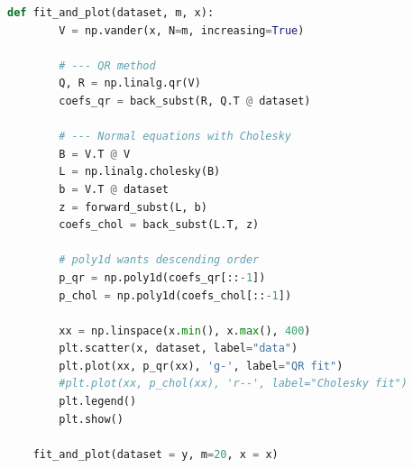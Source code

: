 \documentclass[11pt]{article}
\begin{document}
\begin{lstlisting}[language=Python]
    def fit_and_plot(dataset, m, x):
        V = np.vander(x, N=m, increasing=True)

        # --- QR method
        Q, R = np.linalg.qr(V)
        coefs_qr = back_subst(R, Q.T @ dataset)

        # --- Normal equations with Cholesky
        B = V.T @ V
        L = np.linalg.cholesky(B)
        b = V.T @ dataset
        z = forward_subst(L, b)
        coefs_chol = back_subst(L.T, z)

        # poly1d wants descending order
        p_qr = np.poly1d(coefs_qr[::-1])
        p_chol = np.poly1d(coefs_chol[::-1])

        xx = np.linspace(x.min(), x.max(), 400)
        plt.scatter(x, dataset, label="data")
        plt.plot(xx, p_qr(xx), 'g-', label="QR fit")
        #plt.plot(xx, p_chol(xx), 'r--', label="Cholesky fit")
        plt.legend()
        plt.show()

    fit_and_plot(dataset = y, m=20, x = x)



\end{lstlisting}
\end{document}
